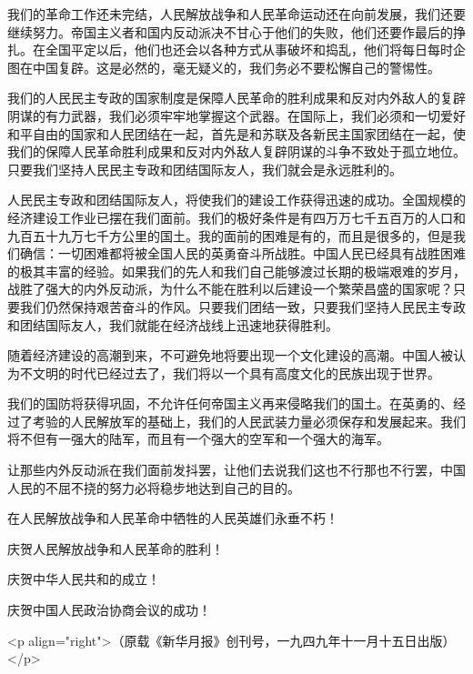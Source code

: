 我们的革命工作还未完结，人民解放战争和人民革命运动还在向前发展，我们还要继续努力。帝国主义者和国内反动派决不甘心于他们的失败，他们还要作最后的挣扎。在全国平定以后，他们也还会以各种方式从事破坏和捣乱，他们将每日每时企图在中国复辟。这是必然的，毫无疑义的，我们务必不要松懈自己的警惕性。

我们的人民民主专政的国家制度是保障人民革命的胜利成果和反对内外敌人的复辟阴谋的有力武器，我们必须牢牢地掌握这个武器。在国际上，我们必须和一切爱好和平自由的国家和人民团结在一起，首先是和苏联及各新民主国家团结在一起，使我们的保障人民革命胜利成果和反对内外敌人复辟阴谋的斗争不致处于孤立地位。只要我们坚持人民民主专政和团结国际友人，我们就会是永远胜利的。

人民民主专政和团结国际友人，将使我们的建设工作获得迅速的成功。全国规模的经济建设工作业已摆在我们面前。我们的极好条件是有四万万七千五百万的人口和九百五十九万七千方公里的国土。我的面前的困难是有的，而且是很多的，但是我们确信：一切困难都将被全国人民的英勇奋斗所战胜。中国人民已经具有战胜困难的极其丰富的经验。如果我们的先人和我们自己能够渡过长期的极端艰难的岁月，战胜了强大的内外反动派，为什么不能在胜利以后建设一个繁荣昌盛的国家呢？只要我们仍然保持艰苦奋斗的作风。只要我们团结一致，只要我们坚持人民民主专政和团结国际友人，我们就能在经济战线上迅速地获得胜利。

随着经济建设的高潮到来，不可避免地将要出现一个文化建设的高潮。中国人被认为不文明的时代已经过去了，我们将以一个具有高度文化的民族出现于世界。

我们的国防将获得巩固，不允许任何帝国主义再来侵略我们的国土。在英勇的、经过了考验的人民解放军的基础上，我们的人民武装力量必须保存和发展起来。我们将不但有一强大的陆军，而且有一个强大的空军和一个强大的海军。

让那些内外反动派在我们面前发抖罢，让他们去说我们这也不行那也不行罢，中国人民的不屈不挠的努力必将稳步地达到自己的目的。

在人民解放战争和人民革命中牺牲的人民英雄们永垂不朽！

庆贺人民解放战争和人民革命的胜利！

庆贺中华人民共和的成立！

庆贺中国人民政治协商会议的成功！

<p align="right">（原载《新华月报》创刊号，一九四九年十一月十五日出版）</p>

